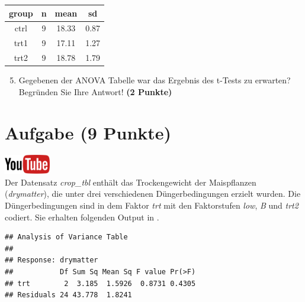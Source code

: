 \documentclass[a4paper, 10pt]{scrartcl}\usepackage[]{graphicx}\usepackage[]{xcolor}
\makeatletter
\newenvironment{kframe}{%
 \def\at@end@of@kframe{}%
 \ifinner\ifhmode%
  \def\at@end@of@kframe{\end{minipage}}%
  \begin{minipage}{\columnwidth}%
 \fi\fi%
 \def\FrameCommand##1{\hskip\@totalleftmargin \hskip-\fboxsep
 \colorbox{shadecolor}{##1}\hskip-\fboxsep
     \hskip-\linewidth \hskip-\@totalleftmargin \hskip\columnwidth}%
 \MakeFramed {\advance\hsize-\width
   \@totalleftmargin\z@ \linewidth\hsize
   \@setminipage}}%
 {\par\unskip\endMakeFramed%
 \at@end@of@kframe}
\newenvironment{knitrout}{}{} %
\makeatother
\begin{document}
\begin{knitrout}
\color{fgcolor}\begin{table}[!h]
\centering
\begin{tabular}{cccc}
\toprule
group & n & mean & sd\\
\midrule
ctrl & 9 & 18.33 & 0.87\\
trt1 & 9 & 17.11 & 1.27\\
trt2 & 9 & 18.78 & 1.79\\
\bottomrule
\end{tabular}
\end{table}

\end{knitrout}

\begin{enumerate}
  \setcounter{enumi}{4}
\item Gegebenen der ANOVA Tabelle war das Ergebnis des t-Tests zu erwarten?
  Begr{\"u}nden Sie Ihre Antwort! \textbf{(2 Punkte)}
\end{enumerate}

 
\clearpage

\section{Aufgabe \hfill (9 Punkte)}

\hfill\href{https://youtu.be/d4CFR2MKX7I}{\includegraphics[width =
  2cm]{img/youtube}}\\[1Ex]

Der Datensatz \textit{crop\_tbl} enth{\"a}lt das Trockengewicht der
Maispflanzen (\textit{drymatter}), die unter drei 
verschiedenen D{\"u}ngerbedingungen erzielt wurden. Die D{\"u}ngerbedingungen sind in dem Faktor
\textit{trt} mit den Faktorstufen \textit{low},  \textit{B} und
 \textit{trt2} codiert. Sie erhalten folgenden Output in \Rlogo.

\begin{knitrout}
\color{fgcolor}\begin{kframe}
\begin{verbatim}
## Analysis of Variance Table
## 
## Response: drymatter
##           Df Sum Sq Mean Sq F value Pr(>F)
## trt        2  3.185  1.5926  0.8731 0.4305
## Residuals 24 43.778  1.8241
\end{verbatim}
\end{kframe}
\end{knitrout}
\end{document}
